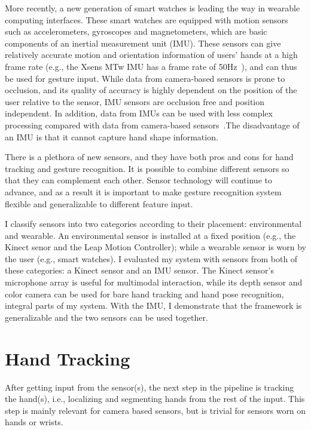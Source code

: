 More recently, a new generation of smart watches is leading the way in wearable
computing interfaces.
These smart watches are equipped with motion sensors such as
accelerometers, gyroscopes and magnetometers, which are basic components of an
inertial measurement
unit
(IMU). These sensors can give relatively accurate motion and orientation
information of users' hands at a high frame rate (e.g., the Xsens MTw IMU has
a frame rate of 50Hz~\cite{Ruffieux2013}), and can thus be used for
gesture input.
While data from camera-based sensors is prone to occlusion, and its quality
of accuracy is highly dependent on the position of the user relative to the
sensor, IMU sensors are occlusion free and position independent. In
addition, data from IMUs can be used with less complex processing
compared with data from camera-based sensors~\cite{Ruffieux2013}.The
disadvantage of an IMU is that it cannot capture hand shape information.

There is a plethora of new sensors, and they have both pros and cons for hand
tracking and gesture recognition. It is possible to combine different sensors
so that they can complement each other. Sensor technology will continue to
advance, and as a result it is important to make gesture recognition system
 flexible and generalizable to different feature input. 

I classify
sensors into two categories according to their placement:
environmental and wearable. An environmental sensor is installed at a fixed
position (e.g., the Kinect senor and the Leap Motion Controller); while a
wearable sensor is worn by the user (e.g., smart watches). I
evaluated my system with sensors from both of these categories: a Kinect
sensor and an IMU sensor.
The Kinect sensor's microphone array is
useful for multimodal interaction, while its depth sensor and color camera can
be used for bare hand tracking and hand pose recognition, integral
parts of my system. With
the IMU, I demonstrate that the framework is generalizable and the two sensors can be used together.

\section{Hand Tracking}
After getting input from the sensor(s), the next step in the pipeline is
tracking the hand(s), i.e., localizing and segmenting hands from the rest of
the input. This step is mainly relevant for camera based sensors, but is trivial
for sensors worn on hands or wrists. 


